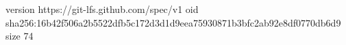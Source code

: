 version https://git-lfs.github.com/spec/v1
oid sha256:16b42f506a2b5522dfb5c172d3d1d9eea75930871b3bfc2ab92e8df0770db6d9
size 74
